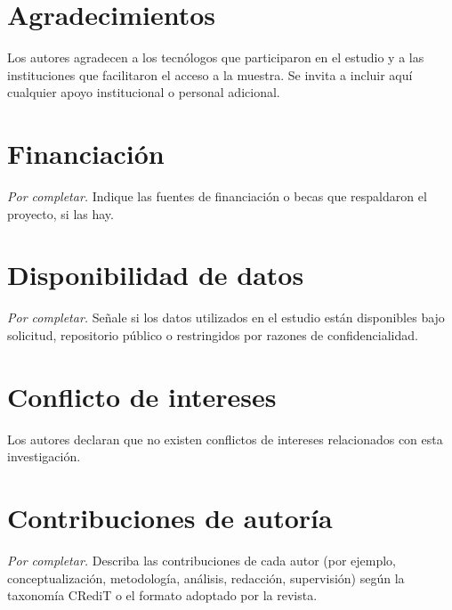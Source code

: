 
\section*{Agradecimientos}
Los autores agradecen a los tecnólogos que participaron en el estudio y a las instituciones que facilitaron el acceso a la muestra. Se invita a incluir aquí cualquier apoyo institucional o personal adicional.

\section*{Financiación}
\emph{Por completar.} Indique las fuentes de financiación o becas que respaldaron el proyecto, si las hay.

\section*{Disponibilidad de datos}
\emph{Por completar.} Señale si los datos utilizados en el estudio están disponibles bajo solicitud, repositorio público o restringidos por razones de confidencialidad.

\section*{Conflicto de intereses}
Los autores declaran que no existen conflictos de intereses relacionados con esta investigación.

\section*{Contribuciones de autoría}
\emph{Por completar.} Describa las contribuciones de cada autor (por ejemplo, conceptualización, metodología, análisis, redacción, supervisión) según la taxonomía CRediT o el formato adoptado por la revista.
